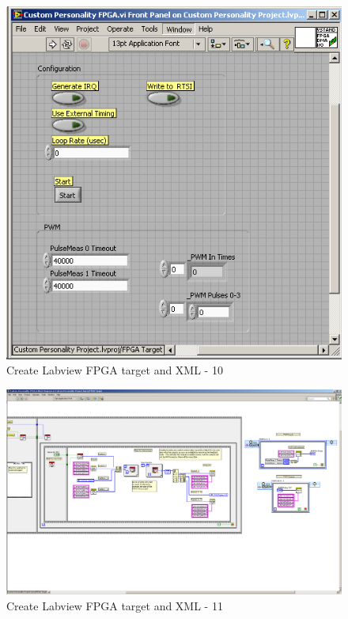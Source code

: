 \documentclass[a4paper,english]{report}
\begin{document}
\begin{figure}[htb!]
	\centering \includegraphics[scale=0.45]{Screenshots/Screenshot_2015-01-16_19-28-41.png}
	\caption{Create Labview FPGA target and XML - 10}
	\label{fig: Create Labview FPGA target and XML-10} 
\end{figure}
\begin{figure}[htb!]
	\centering \includegraphics[angle=-90,scale=0.45]{Screenshots/Screenshot_2015-01-16_19-29-04.png}
	\caption{Create Labview FPGA target and XML - 11}
	\label{fig: Create Labview FPGA target and XML-11} 
\end{figure}
\end{document}
